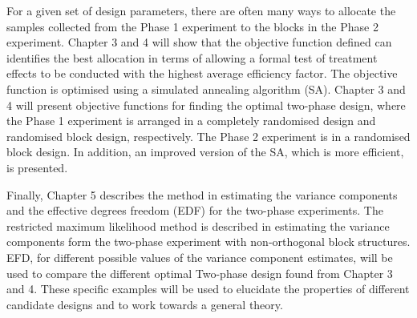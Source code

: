 \documentclass[11pt,a4paper]{article}
\begin{document}
For a given set of design parameters, there are often many ways to allocate the samples collected from the Phase 1 experiment to the blocks in the Phase 2 experiment. Chapter 3 and 4 will show that the objective function defined can identifies the best allocation in terms of allowing a formal test of treatment effects to be conducted with the highest average efficiency factor. The objective function is optimised using a simulated annealing algorithm (SA). Chapter 3 and 4 will present objective functions for finding the optimal two-phase design, where the Phase 1 experiment is arranged in a completely randomised design and randomised block design, respectively. The Phase 2 experiment is in a randomised block design. In addition, an improved version of the SA, which is more efficient, is presented.

Finally, Chapter 5 describes the method in estimating the variance components and the effective degrees freedom (EDF) for the two-phase experiments. The restricted maximum likelihood method is described in estimating the variance components form the two-phase experiment with non-orthogonal block structures. EFD, for different possible values of the variance component estimates, will be used to compare the different optimal Two-phase design found from Chapter 3 and 4. These specific examples will be used to elucidate the properties of different candidate designs and to work towards a general theory.  




\end{document}
